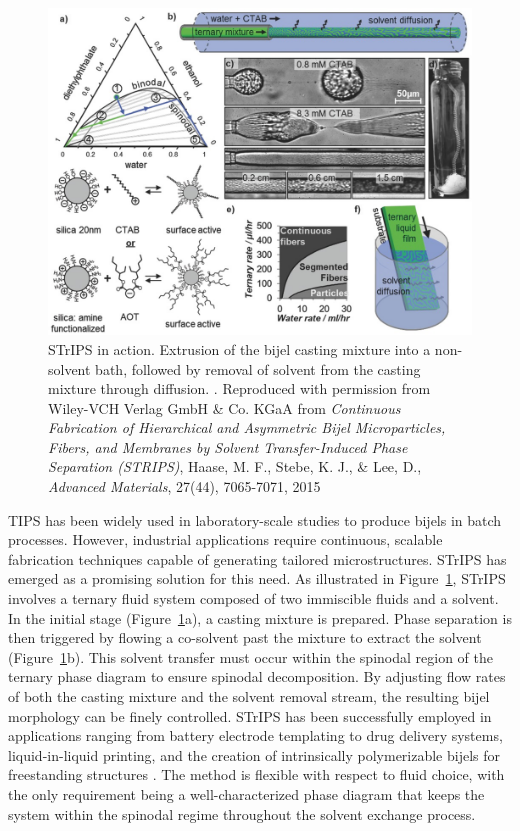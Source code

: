 \begin{figure}
    \centering
    \includegraphics[scale = 5]{figures/introduction/STrIPS.jpg}
    \caption{STrIPS in action. Extrusion of the bijel casting mixture into a non-solvent bath, followed by removal of solvent from 
             the casting mixture through diffusion. \cite{haase_continuous_2015}. Reproduced with permission from Wiley-VCH Verlag GmbH 
             \& Co. KGaA from \textit{Continuous Fabrication of Hierarchical and Asymmetric Bijel Microparticles, Fibers, and Membranes by 
             Solvent Transfer-Induced Phase Separation (STRIPS)}, Haase, M. F., Stebe, K. J., 
             \& Lee, D., \textit{Advanced Materials}, 27(44), 7065-7071, 2015}
    \label{fig:strips}
\end{figure}

TIPS has been widely used in laboratory-scale studies to produce bijels in batch processes. However, industrial applications require continuous, scalable fabrication techniques capable of generating 
tailored microstructures. STrIPS has emerged as a promising solution for this need. As illustrated in Figure~\ref{fig:strips}, STrIPS involves a ternary fluid system composed of two immiscible fluids 
and a solvent. In the initial stage (Figure~\ref{fig:strips}a), a casting mixture is prepared. Phase separation is then triggered by flowing a co-solvent past the mixture to extract the solvent 
(Figure~\ref{fig:strips}b). This solvent transfer must occur within the spinodal region of the ternary phase diagram to ensure spinodal decomposition. By adjusting flow rates of both the casting 
mixture and the solvent removal stream, the resulting bijel morphology can be finely controlled. STrIPS has been successfully employed in applications ranging from battery electrode templating to drug 
delivery systems, liquid-in-liquid printing, and the creation of intrinsically polymerizable bijels for freestanding structures 
\cite{garcia_scalable_2019, thorson_bijel-templated_2019, amirfattahi_fabrication_2024, ching_rapid_2021}. The method is flexible with respect to fluid choice, with 
the only requirement being a well-characterized phase diagram that keeps the system within the spinodal regime throughout the solvent exchange process.

